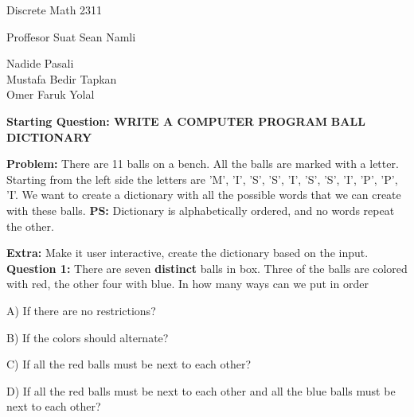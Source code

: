 \documentclass[11pt]{article}
\begin{document}
\begin{center}
Discrete Math 2311
\end{center}

\begin{center}
Proffesor Suat Sean Namli\\
\end{center}

\begin{center}
Nadide Pasali\\
Mustafa Bedir Tapkan\\
Omer Faruk Yolal\\
\end{center}

\newpage

\textbf{Starting Question: WRITE A COMPUTER PROGRAM} 
\textbf{BALL DICTIONARY}

\textbf{Problem:} There are 11 balls on a bench. All the balls are marked with a letter. 
Starting from the left side the letters are 'M', 'I', 'S', 'S', 'I', 'S', 'S', 'I', 'P', 'P', 'I'. We want to 
create a dictionary with all the possible words that we can create with these balls. %
 \textbf{PS:} Dictionary is alphabetically ordered, and no words repeat the other. %

\textbf{Extra:} Make it user interactive, create the dictionary based on the input.
\\

\textbf{Question 1:} There are seven \textbf{distinct} balls in box. Three of the balls are colored with red, the other four with blue. In how many ways can we put in order 

A) If there are no restrictions?

B) If the colors should alternate?

C) If all the red balls must be next to each other?

D) If all the red balls must be next to each other and all the blue balls must be next to each other?
\\
\end{document}

